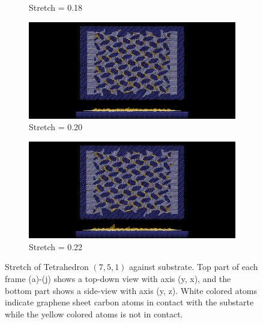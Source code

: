 \begin{figure}[H]
\begin{subfigure}[b]{0.49\textwidth}
        \caption{Stretch = 0.18}
        \label{fig:}
    \end{subfigure}
    \begin{subfigure}[b]{0.49\textwidth}
        \centering
        \includegraphics[width=\textwidth]{figures/baseline/contact_vs_stretch/popup/pop_stretch0020.png}
        \caption{Stretch = 0.20}
        \label{fig:}
    \end{subfigure}
    \begin{subfigure}[b]{0.49\textwidth}
        \centering
        \includegraphics[width=\textwidth]{figures/baseline/contact_vs_stretch/popup/pop_stretch0022.png}
        \caption{Stretch = 0.22}
        \label{fig:}
    \end{subfigure}
    \hfill
       \caption{Stretch of Tetrahedron $(7,5,1)$ against substrate. Top part of each frame (a)-(j) shows a top-down view with axis (y, x), and the bottom part shows a side-view with axis (y, z). White colored atoms indicate graphene sheet carbon atoms in contact with the substarte while the yellow colored atoms is not in contact.}
       \label{fig:}
  \end{figure}

